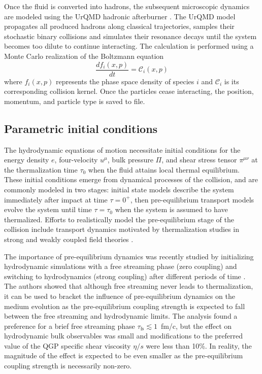\documentclass[aps,prc,reprint,amsmath,nofootinbib,superscriptaddress]{revtex4-1}
\begin{document}
Once the fluid is converted into hadrons, the subsequent microscopic dynamics are modeled using the UrQMD hadronic afterburner \cite{Bass:1998ca, Bleicher:1999xi}.
The UrQMD model propagates all produced hadrons along classical trajectories, samples their stochastic binary collisions and simulates their resonance decays until the system becomes too dilute to continue interacting.
The calculation is performed using a Monte Carlo realization of the Boltzmann equation
\begin{equation}
  \frac{df_i(x,p)}{dt} = \mathcal{C}_i(x, p)
\end{equation}
where $f_i(x,p)$ represents the phase space density of species $i$ and $\mathcal{C}_i$ is its corresponding collision kernel.
Once the particles cease interacting, the position, momentum, and particle type is saved to file.

\subsection{Parametric initial conditions}

The hydrodynamic equations of motion necessitate initial conditions for the energy density $e$, four-velocity $u^\mu$, bulk pressure $\Pi$, and shear stress tensor $\pi^{\mu\nu}$ at the thermalization time $\tau_0$ when the fluid attains local thermal equilibrium.
These initial conditions emerge from dynamical processes of the collision, and are commonly modeled in two stages: initial state models describe the system immediately after impact at time $\tau=0^+$, then pre-equilibrium transport models evolve the system until time $\tau=\tau_0$ when the system is assumed to have thermalized. 
Efforts to realistically model the pre-equilibrium stage of the collision include transport dynamics \cite{Schenke:2012wb, Schenke:2012fw, vanderSchee:2013pia, vanderSchee:2015rta, Chesler:2015fpa} motivated by thermalization studies in strong and weakly coupled field theories \cite{Romatschke:2006nk, Krasnitz:2002ng, Berges:2013eia, Arnold:2004ti, Kurkela:2011ti, Heller:2012km, vanderSchee:2013pia, Rebhan:2004ur, Heller:2011ju, Janik:2006gp}. 

The importance of pre-equilibrium dynamics was recently studied by initializing hydrodynamic simulations with a free streaming phase (zero coupling) and switching to hydrodynamics (strong coupling) after different periods of time \cite{Liu:2015nwa}.
The authors showed that although free streaming never leads to thermalization, it can be used to bracket the influence of pre-equilibrium dynamics on the medium evolution as the pre-equilibrium coupling strength is expected to fall between the free streaming and hydrodynamic limits.
The analysis found a preference for a brief free streaming phase ${\tau_\text{fs} \lesssim 1}$~fm/c, but the effect on hydrodynamic bulk observables was small and modifications to the preferred value of the QGP specific shear viscosity $\eta/s$ were less than 10\%.
In reality, the magnitude of the effect is expected to be even smaller as the pre-equilibrium coupling strength is necessarily non-zero.
\end{document}
